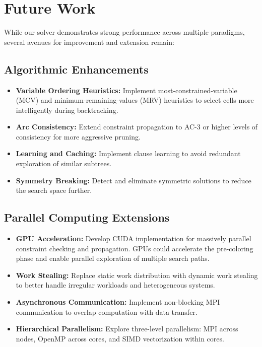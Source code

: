 \section{Future Work}
While our solver demonstrates strong performance across multiple paradigms, several avenues for improvement and extension remain:

\subsection{Algorithmic Enhancements}
\begin{itemize}
    \item \textbf{Variable Ordering Heuristics:} Implement most-constrained-variable (MCV) and minimum-remaining-values (MRV) heuristics to select cells more intelligently during backtracking.
    
    \item \textbf{Arc Consistency:} Extend constraint propagation to AC-3 or higher levels of consistency for more aggressive pruning.
    
    \item \textbf{Learning and Caching:} Implement clause learning to avoid redundant exploration of similar subtrees.
    
    \item \textbf{Symmetry Breaking:} Detect and eliminate symmetric solutions to reduce the search space further.
\end{itemize}

\subsection{Parallel Computing Extensions}
\begin{itemize}
    \item \textbf{GPU Acceleration:} Develop CUDA implementation for massively parallel constraint checking and propagation. GPUs could accelerate the pre-coloring phase and enable parallel exploration of multiple search paths.
    
    \item \textbf{Work Stealing:} Replace static work distribution with dynamic work stealing to better handle irregular workloads and heterogeneous systems.
    
    \item \textbf{Asynchronous Communication:} Implement non-blocking MPI communication to overlap computation with data transfer.
    
    \item \textbf{Hierarchical Parallelism:} Explore three-level parallelism: MPI across nodes, OpenMP across cores, and SIMD vectorization within cores.
\end{itemize}

